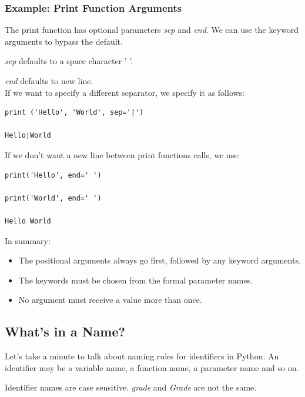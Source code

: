 \documentclass{article}
\begin{document}
\subsubsection{Example: Print Function Arguments}

The print function has optional parameters \textit{sep} and \textit{end}.  We can use the keyword arguments to bypass the default.

\textit{sep} defaults to a space character ' '.

\textit{end} defaults to new line.\\ 

If we want to specify a different separator, we specify it as follows:

\begin{lstlisting}
print ('Hello', 'World', sep='|')

Hello|World

\end{lstlisting}

If we don't want a new line between print functions calls, we use:

\begin{lstlisting}
print('Hello', end=' ')

print('World', end=' ')

Hello World

\end{lstlisting}

In summary:
\begin{itemize}
\item The positional arguments always go first, followed by any keyword arguments.

\item The keywords must be chosen from the formal parameter names.

\item No argument must receive a value more than once. 
\end{itemize}

\subsection{What's in a Name?}

Let's take a minute to talk about naming rules for identifiers in Python.  An identifier may be a variable name, a function name, a parameter name and so on.

Identifier names are case sensitive.  \textit{grade} and \textit{Grade} are not the same.
\end{document}
